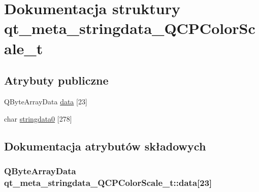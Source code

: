\hypertarget{structqt__meta__stringdata___q_c_p_color_scale__t}{}\section{Dokumentacja struktury qt\+\_\+meta\+\_\+stringdata\+\_\+\+Q\+C\+P\+Color\+Scale\+\_\+t}
\label{structqt__meta__stringdata___q_c_p_color_scale__t}
\subsection*{Atrybuty publiczne}
\begin{DoxyCompactItemize}
\item 
Q\+Byte\+Array\+Data \hyperlink{structqt__meta__stringdata___q_c_p_color_scale__t_adbfbd7275c982d9d6c70985a35909562}{data} \mbox{[}23\mbox{]}
\item 
char \hyperlink{structqt__meta__stringdata___q_c_p_color_scale__t_a0ed4cd437d62f56ea375637ec624a59c}{stringdata0} \mbox{[}278\mbox{]}
\end{DoxyCompactItemize}


\subsection{Dokumentacja atrybutów składowych}
\subsubsection[{\texorpdfstring{data}{data}}]{\setlength{\rightskip}{0pt plus 5cm}Q\+Byte\+Array\+Data qt\+\_\+meta\+\_\+stringdata\+\_\+\+Q\+C\+P\+Color\+Scale\+\_\+t\+::data\mbox{[}23\mbox{]}}\hypertarget{structqt__meta__stringdata___q_c_p_color_scale__t_adbfbd7275c982d9d6c70985a35909562}{}\label{structqt__meta__stringdata___q_c_p_color_scale__t_adbfbd7275c982d9d6c70985a35909562}
